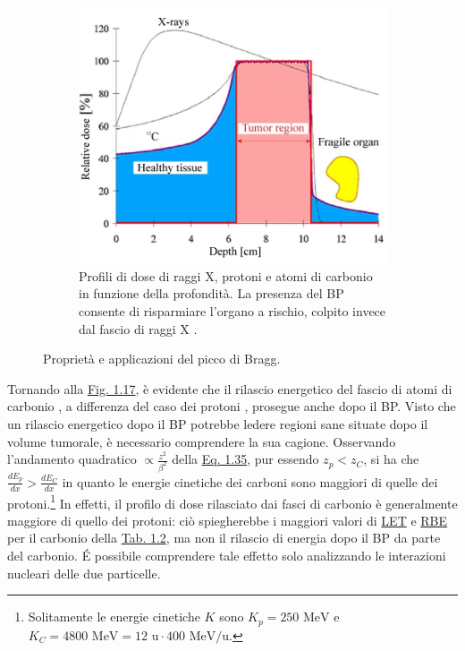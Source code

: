 \documentclass[12pt,a4paper,twoside]{report}
\begin{document}
\begin{figure}[H]
\begin{subfigure}[t]{0.49\textwidth}
			\label{fig:sobp}
		\end{subfigure}
		\par
		\begin{subfigure}[t]{0.49\textwidth}
			\centering
			\includegraphics[width=\textwidth, scale=0.50]{critical_organ.jpg}
			\caption{Profili di dose di raggi X, protoni e atomi di carbonio in funzione della profondità. La presenza del BP consente di risparmiare l'organo a rischio, colpito invece dal fascio di raggi X \cite{unipv_conference2}.}
			\label{fig:critical_organ}
		\end{subfigure}
		\caption{Proprietà e applicazioni del picco di Bragg.}
	\end{figure}
	Tornando alla \hyperref[fig:photon]{Fig. 1.17}, è evidente che il rilascio energetico del fascio di atomi di carbonio , a differenza del caso dei protoni , prosegue anche dopo il BP. Visto che un rilascio energetico dopo il BP potrebbe ledere regioni sane situate dopo il volume tumorale, è necessario comprendere la sua cagione. Osservando l'andamento quadratico $\propto\frac{z^2}{\beta^2}$ della \hyperref[eq:bethe_bloch]{Eq. 1.35}, pur essendo $z_p<z_C$, si ha che $\frac{dE_p}{dx}>\frac{dE_C}{dx}$ in quanto le energie cinetiche dei carboni sono maggiori di quelle dei protoni.\footnote{Solitamente le energie cinetiche $K$ sono $K_p=250 \mbox{ MeV}$ e $K_C=4800\mbox{ MeV}=12\mbox{ u}\cdot400\mbox{ MeV/u}$.} In effetti, il profilo di dose rilasciato dai fasci di carbonio è generalmente maggiore di quello dei protoni: ciò spiegherebbe i maggiori valori di \hyperref[par:let]{LET} e \hyperref[par:rbe]{RBE} per il carbonio della \hyperref[tab:let_rbe]{Tab. 1.2}, ma non il rilascio di energia dopo il BP da parte del carbonio. \'E possibile comprendere tale effetto solo analizzando le interazioni nucleari delle due particelle.
	
\end{document}
